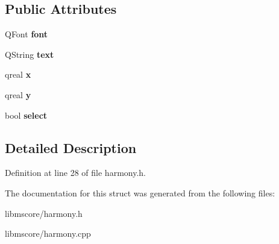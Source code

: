 \subsection*{Public Attributes}
\begin{DoxyCompactItemize}
\item 
\mbox{\label{struct_ms_1_1_text_segment_aa9afd1709928b6130a2b7ae3474af06d}} 
Q\+Font {\bfseries font}
\item 
\mbox{\label{struct_ms_1_1_text_segment_aae1e66c1d18b34de4000369d95cae04a}} 
Q\+String {\bfseries text}
\item 
\mbox{\label{struct_ms_1_1_text_segment_a93bbadc930336dc16043bbe947697dbd}} 
qreal {\bfseries x}
\item 
\mbox{\label{struct_ms_1_1_text_segment_a784f44a17f9ea477b229b08ff9f131fb}} 
qreal {\bfseries y}
\item 
\mbox{\label{struct_ms_1_1_text_segment_aa34700c3e2e42f34e4076d861d4de77c}} 
bool {\bfseries select}
\end{DoxyCompactItemize}


\subsection{Detailed Description}


Definition at line 28 of file harmony.\+h.



The documentation for this struct was generated from the following files\+:\begin{DoxyCompactItemize}
\item 
libmscore/harmony.\+h\item 
libmscore/harmony.\+cpp\end{DoxyCompactItemize}
